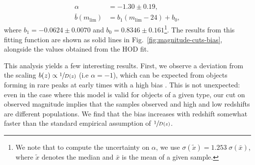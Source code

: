 \documentclass[a4paper,11pt]{article}
\begin{document}
    \begin{equation}
      \begin{aligned}
        \alpha &= -1.30 \pm 0.19,\\
        \bar{b}(m_{\mathrm{lim}}) &= b_{1}(m_{\mathrm{lim}}-24) + b_{0},
        \label{eq:bias-fit-func-result}
      \end{aligned}
    \end{equation}
    where $b_{1} = -0.0624 \pm 0.0070$ and $b_{0} = 0.8346 \pm 0.161$\footnote{We note that to compute the uncertainty on $\alpha$, we use $\sigma(\tilde{x}) = 1.253 \; \sigma(\bar{x})$, where $\tilde{x}$ denotes the median and $\bar{x}$ is the mean of a given sample.}. The results from this fitting function are shown as solid lines in Fig.~\ref{fig:magnitude-cuts-bias}, alongside the values obtained from the HOD fit.

    This analysis yields a few interesting results. First, we observe a deviation from the scaling $b(z) \propto \sfrac{1}{D(z)}$ (i.e $\alpha=-1$), which can be expected from objects forming in rare peaks at early times with a high bias \cite{1986ApJ...304...15B,1996MNRAS.282..347M,1998ApJ...500L..79T,Coil:2004}. This is not unexpected: even in the case where this model is valid for objects of a given type, our cut on observed magnitude implies that the samples observed and high and low redshifts are different populations. We find that the bias increases with redshift somewhat faster than the standard empirical assumption of $\sfrac{1}{D(z)}$.
\end{document}
